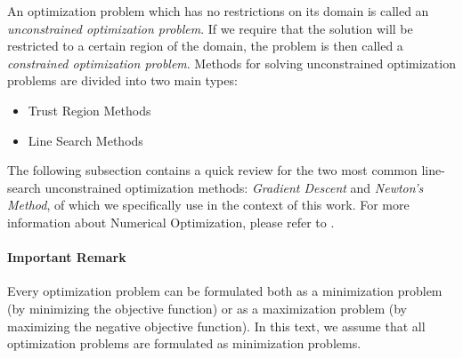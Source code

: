 \noindent An optimization problem which has no restrictions on its domain is called an \emph{unconstrained optimization problem}. If we require that the solution will be restricted to a certain region of the domain, the problem is then called a \emph{constrained optimization problem}. Methods for solving unconstrained optimization problems are divided into two main types:
\begin{itemize}
    \item Trust Region Methods
    \item Line Search Methods
\end{itemize}

The following subsection contains a quick review for the two most common line-search unconstrained optimization methods: \emph{Gradient Descent} and \emph{Newton's Method}, of which we specifically use in the context of this work. For more information about Numerical Optimization, please refer to \cite{Nocedal2006Numerical}.
\paragraph{Important Remark} Every optimization problem can be formulated both as a minimization problem (by minimizing the objective function) or as a maximization problem (by maximizing the negative objective function). In this text, we assume that all optimization problems are formulated as minimization problems.
